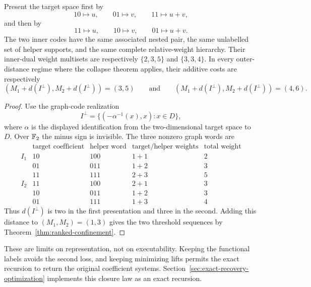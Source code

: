 \begin{proposition}
\label{prop:coefficient-presentation}
%
Present the target space first by
\[
 10\mapsto u,\qquad01\mapsto v,\qquad11\mapsto u+v,
\]
and then by
\[
 11\mapsto u,\qquad10\mapsto v,\qquad01\mapsto u+v.
\]
The two inner codes have the same associated nested pair, the same unlabelled
set of helper supports, and the same complete relative-weight
hierarchy.  Their inner-dual weight multisets are respectively
$\{2,3,5\}$ and $\{3,3,4\}$.  In every outer-distance regime where the
collapse theorem applies, their additive costs are
respectively
\[
 (M_1+d(I^\perp),M_2+d(I^\perp))=(3,5)
 \qquad\text{and}\qquad
 (M_1+d(I^\perp),M_2+d(I^\perp))=(4,6).
\]
\end{proposition}

\begin{proof}
Use the graph-code realization
\[
 I^\perp=\{(-\alpha^{-1}(x),x):x\in D\},
\]
where $\alpha$ is the displayed identification from the two-dimensional
target space to $D$.  Over $\mathbb F_2$ the minus sign is invisible.  The three
nonzero graph words are
\[
\begin{array}{c|c|c|c|c}
 & \text{target coefficient} & \text{helper word}
 & \text{target/helper weights} & \text{total weight}\\ \hline
I_1 & 10 & 100 & 1+1 & 2\\
    & 01 & 011 & 1+2 & 3\\
    & 11 & 111 & 2+3 & 5\\ \hline
I_2 & 11 & 100 & 2+1 & 3\\
    & 10 & 011 & 1+2 & 3\\
    & 01 & 111 & 1+3 & 4
\end{array}
\]
Thus $d(I^\perp)$ is two in the first
presentation and three in the second.  Adding this distance to
$(M_1,M_2)=(1,3)$ gives the two threshold sequences by
Theorem~\ref{thm:ranked-confinement}.
%
%
\end{proof}

These are limits on representation, not on executability.  Keeping the
functional labels avoids the second loss, and keeping minimizing lifts permits
the exact recursion to return the original coefficient systems.  Section~\ref{sec:exact-recovery-optimization} implements this closure law
as an exact recursion.
